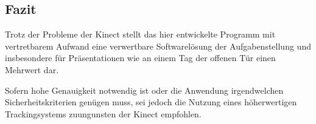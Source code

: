 \subsection{Fazit}
Trotz der Probleme der Kinect stellt das hier entwickelte Programm mit vertretbarem Aufwand eine verwertbare Softwarelösung der Aufgabenstellung und insbesondere für Präsentationen wie an einem Tag der offenen Tür einen Mehrwert dar.\par 
Sofern hohe Genauigkeit notwendig ist oder die Anwendung irgendwelchen Sicherheitskriterien genügen muss, sei jedoch die Nutzung eines höherwertigen Trackingsystems zuungunsten der Kinect empfohlen.\par 